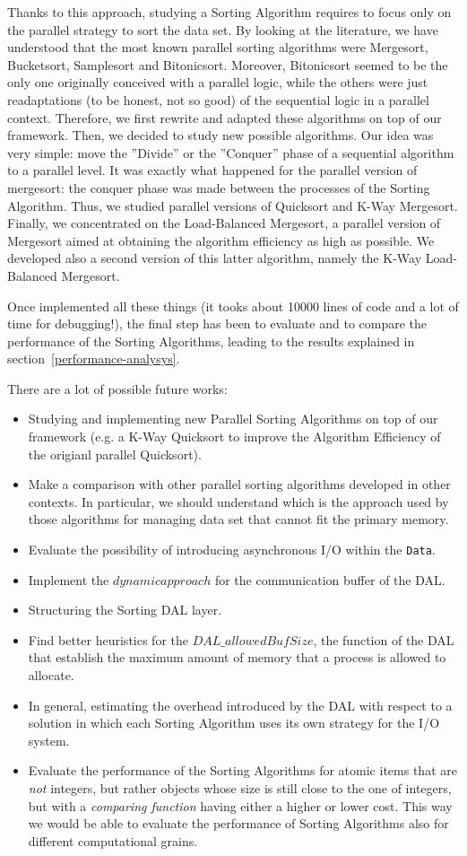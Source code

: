 Thanks to this approach, studying a Sorting Algorithm requires to focus only on the parallel strategy to sort the data set. By looking at the literature, we have understood that the most known parallel sorting algorithms were Mergesort, Bucketsort, Samplesort and Bitonicsort. Moreover, Bitonicsort seemed to be the only one originally conceived with a parallel logic, while the others were just readaptations (to be honest, not so good) of the sequential logic in a parallel context. Therefore, we first rewrite and adapted these algorithms on top of our framework. Then, we decided to study new possible algorithms. Our idea was very simple: move the ''Divide'' or the ''Conquer'' phase of a sequential algorithm to a parallel level. It was exactly what happened for the parallel version of mergesort: the conquer phase was made between the processes of the Sorting Algorithm. Thus, we studied parallel versions of Quicksort and K-Way Mergesort. Finally, we concentrated on the Load-Balanced Mergesort, a parallel version of Mergesort aimed at obtaining the algorithm efficiency as high as possible. We developed also a second version of this latter algorithm, namely the K-Way Load-Balanced Mergesort. 

Once implemented all these things (it tooks about 10000 lines of code and a lot of time for debugging!), the final step has been to evaluate and to compare the performance of the Sorting Algorithms, leading to the results explained in section~\ref{performance-analysys}. 

There are a lot of possible future works:  
\begin{itemize}
\item Studying and implementing new Parallel Sorting Algorithms on top of our framework (e.g. a K-Way Quicksort to improve the Algorithm Efficiency of the origianl parallel Quicksort).
\item Make a comparison with other parallel sorting algorithms developed in other contexts. In particular, we should understand which is the approach used by those algorithms for managing data set that cannot fit the primary memory.
\item Evaluate the possibility of introducing asynchronous I/O within the \texttt{Data}. 
\item Implement the $dynamic approach$ for the communication buffer of the DAL.
\item Structuring the Sorting DAL layer.
\item Find better heuristics for the $DAL\_allowedBufSize$, the function of the DAL that establish the maximum amount of memory that a process is allowed to allocate.
\item In general, estimating the overhead introduced by the DAL with respect to a solution in which each Sorting Algorithm uses its own strategy for the I/O system.
\item Evaluate the performance of the Sorting Algorithms for atomic items that are \textit{not} integers, but rather objects whose size is still close to the one of integers, but with a \textit{comparing function} having either a higher or lower cost. This way we would be able to evaluate the performance of Sorting Algorithms also for different computational grains.
\end{itemize}